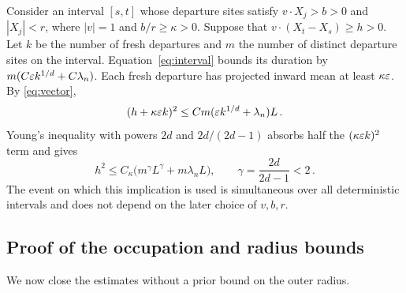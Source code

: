 Consider an interval $[s,t]$ whose departure sites satisfy
$v\cdot X_j>b>0$ and $|X_j|<r$, where $|v|=1$ and $b/r\geq\kappa>0$.
Suppose that $v\cdot(X_t-X_s)\geq h>0$.
Let $k$ be the number of fresh departures and $m$ the number of
distinct departure sites on the interval.
Equation~\eqref{eq:interval} bounds its duration by
$m(C\varepsilon k^{1/d}+C\lambda_n)$.
Each fresh departure has projected inward mean at least $\kappa\varepsilon$.
By \eqref{eq:vector},
\begin{equation}\label{eq:crossing-before-young}
(h+\kappa\varepsilon k)^2\leq Cm(\varepsilon k^{1/d}+\lambda_n)L\, .
\end{equation}
Young's inequality with powers $2d$ and $2d/(2d-1)$ absorbs half
the $(\kappa\varepsilon k)^2$ term and gives
\begin{equation}\label{eq:crossing}
h^2\leq C_\kappa\bigl(m^\gamma L^\gamma+m\lambda_nL\bigr) ,
\qquad\gamma=\frac{2d}{2d-1}<2\, .
\end{equation}
The event on which this implication is used is simultaneous over
all deterministic intervals and does not depend on the later choice
of $v,b,r$.

\subsection{Proof of the occupation and radius bounds}
We now close the estimates without a prior bound on the outer radius.

